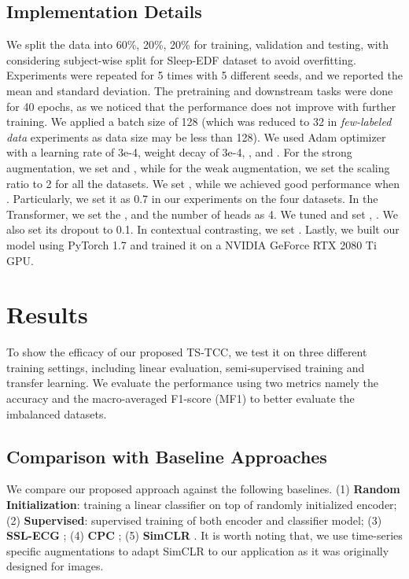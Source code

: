 \documentclass{article}
\begin{document}
\subsection{Implementation Details}
We split the data into 60\%, 20\%, 20\% for training, validation and testing, with considering subject-wise split for Sleep-EDF dataset to avoid overfitting.
Experiments were repeated for 5 times with 5 different seeds, and we reported the mean and standard deviation.
The pretraining and downstream tasks were done for 40 epochs, as we noticed that the performance does not improve with further training.
We applied a batch size of 128 (which was reduced to 32 in \textit{few-labeled data} experiments as data size may be less than 128).
We used Adam optimizer with a learning rate of 3e-4, weight decay of 3e-4, , and .
For the strong augmentation, we set  and , while for the weak augmentation, we set the scaling ratio to 2 for all the datasets.
We set , while we achieved good performance when . Particularly, we set it as 0.7 in our experiments on the four datasets.
In the Transformer, we set the , and the number of heads as 4. We tuned  and set , . We also set its dropout to 0.1.
In contextual contrasting, we set .
Lastly, we built our model using PyTorch 1.7 and trained it on a NVIDIA GeForce RTX 2080 Ti GPU.





\section{Results}
To show the efficacy of our proposed TS-TCC, we test it on three different training settings, including linear evaluation, semi-supervised training and transfer learning. 
We evaluate the performance using two metrics namely the accuracy and the macro-averaged F1-score (MF1) to better evaluate the imbalanced datasets. 


\subsection{Comparison with Baseline Approaches}
We compare our proposed approach against the following baselines. 
(1) \textbf{Random Initialization}: training a linear classifier on top of randomly initialized encoder; (2) \textbf{Supervised}: supervised training of both encoder and classifier model; (3) \textbf{SSL-ECG} \cite{ecg_emotion_rec};
(4) \textbf{CPC} \cite{oord2018representation}; (5)  \textbf{SimCLR} \cite{chen2020simple}. It is worth noting that, we use time-series specific augmentations to adapt SimCLR to our application as it was originally designed for images.
\end{document}
